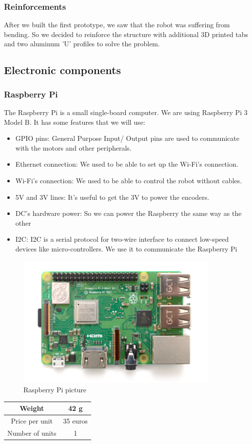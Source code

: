 \subsubsection{Reinforcements}
After we built the first prototype, we saw that the robot was suffering
from bending. So we decided to reinforce the structure with additional 3D
printed tabs and two aluminum 'U' profiles to solve the problem.

\subsection{Electronic components}
\subsubsection{Raspberry Pi}
The Raspberry Pi is a small single-board computer.
We are using Raspberry Pi 3 Model B. It has some features that we will use:
\begin{itemize}
    \item GPIO pins: General Purpose Input/ Output pins are used to
    communicate with the motors and other peripherals.
    \item Ethernet connection: We used to be able to set up the Wi-Fi's connection.
    \item Wi-Fi's connection: We used to be able to control the robot without cables.
    \item 5V and 3V lines: It's useful to get the 3V to power the encoders.
    \item DC's hardware power: So we can power the Raspberry the same way as the
          other
    \item I2C: I2C is a serial protocol for two-wire interface to
          connect low-speed devices like micro-controllers. We use it to communicate
          the Raspberry Pi
\end{itemize}
\begin{figure}[H]
    \centering
    \includegraphics[width=10cm]{img/components/raspberry_pi.png}
    \caption{Raspberry Pi picture}
    \label{fig:}
\end{figure}
\begin{center}
    \begin{tabular}{ |c|c| }
        \hline
        Weight          & 42 g     \\
        \hline
        Price per unit  & 35 euros \\
        \hline
        Number of units & 1        \\
        \hline
    \end{tabular}
\end{center}
